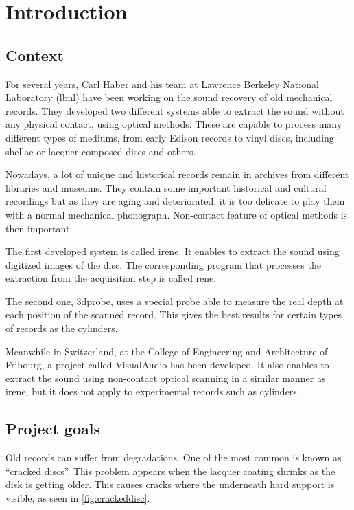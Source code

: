 
\chapter{Introduction}

\section{Context}

For several years, Carl Haber and his team at Lawrence Berkeley National Laboratory (\gls{lbnl}) have been working on the sound recovery of old mechanical records. They developed two different systems able to extract the sound without any physical contact, using optical methods. These are capable to process many different types of mediums, from early Edison records to vinyl discs, including shellac or lacquer composed discs and others.

Nowadays, a lot of unique and historical records remain in archives from different libraries and museums. They contain some important historical and cultural recordings but as they are aging and deteriorated, it is too delicate to play them with a normal mechanical phonograph. Non-contact feature of optical methods is then important.

The first developed system is called \gls{irene}. It enables to extract the sound using digitized images of the disc. The corresponding program that processes the extraction from the acquisition step is called \gls{rene}.

The second one, \gls{3dprobe}, uses a special probe able to measure the real depth at each position of the scanned record. This gives the best results for certain types of records as the cylinders.

Meanwhile in Switzerland, at the College of Engineering and Architecture of Fribourg, a project called VisualAudio has been developed. It also enables to extract the sound using non-contact optical scanning in a similar manner as \gls{irene}, but it does not apply to experimental records such as cylinders.

\section{Project goals}

Old records can suffer from degradations. One of the most common is known as ``cracked discs''. This problem appears when the lacquer coating shrinks as the disk is getting older. This causes cracks where the underneath hard support is visible, as seen in \autoref{fig:crackeddisc}.

